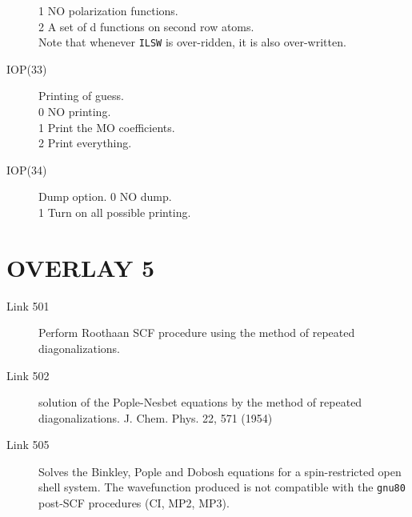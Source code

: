 \begin{description}
1  NO polarization functions. \\
2  A set of d functions on second row atoms. \\
Note that whenever {\tt ILSW} is over-ridden, it is also over-written.
\item[IOP(33)]  Printing of guess.  \\
0  NO printing. \\
1  Print the MO coefficients. \\
2  Print everything. \\
\item[IOP(34)]  Dump option.
0  NO dump. \\
1  Turn on all possible printing. \\
\end{description}
\section{\sf OVERLAY 5}
\begin{description}
\item[Link 501] Perform Roothaan SCF procedure using the method
of repeated diagonalizations.
\item[Link 502]  solution of the Pople-Nesbet equations by the method of
repeated diagonalizations.  J. Chem. Phys. 22, 571 (1954)
\item[Link 505]  Solves the Binkley, Pople and Dobosh equations for a
spin-restricted open shell system. The wavefunction
produced is not compatible with the {\tt gnu80} post-SCF
procedures (CI, MP2, MP3).
\end{description}
